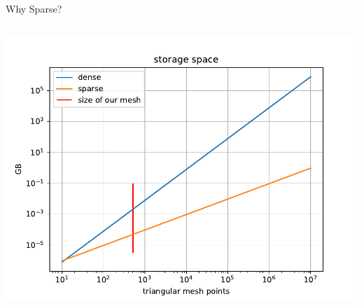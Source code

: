 \documentclass[aspectratio=169,xcolor=dvipsnames]{beamer}
\begin{document}
\begin{frame}{Why Sparse?}
\begin{columns}[c]
        \begin{center}
    \includegraphics[width=1\linewidth]{storage_space.pdf}
    \end{center}

    \end{columns}
\end{frame}
\end{document}

